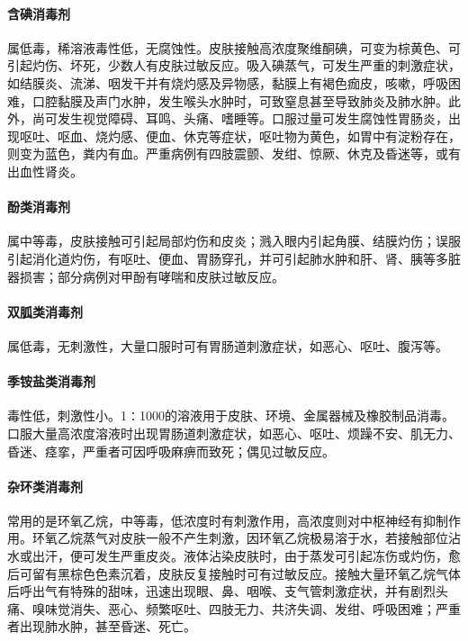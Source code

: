 \paragraph{含碘消毒剂}

属低毒，稀溶液毒性低，无腐蚀性。皮肤接触高浓度聚维酮碘，可变为棕黄色、可引起灼伤、坏死，少数人有皮肤过敏反应。吸入碘蒸气，可发生严重的刺激症状，如结膜炎、流涕、咽发干并有烧灼感及异物感，黏膜上有褐色痂皮，咳嗽，呼吸困难，口腔黏膜及声门水肿，发生喉头水肿时，可致窒息甚至导致肺炎及肺水肿。此外，尚可发生视觉障碍、耳鸣、头痛、嗜睡等。口服过量可发生腐蚀性胃肠炎，出现呕吐、呕血、烧灼感、便血、休克等症状，呕吐物为黄色，如胃中有淀粉存在，则变为蓝色，粪内有血。严重病例有四肢震颤、发绀、惊厥、休克及昏迷等，或有出血性肾炎。

\paragraph{酚类消毒剂}

属中等毒，皮肤接触可引起局部灼伤和皮炎；溅入眼内引起角膜、结膜灼伤；误服引起消化道灼伤，有呕吐、便血、胃肠穿孔，并可引起肺水肿和肝、肾、胰等多脏器损害；部分病例对甲酚有哮喘和皮肤过敏反应。

\paragraph{双胍类消毒剂}

属低毒，无刺激性，大量口服时可有胃肠道刺激症状，如恶心、呕吐、腹泻等。

\paragraph{季铵盐类消毒剂}

毒性低，刺激性小。1∶1000的溶液用于皮肤、环境、金属器械及橡胶制品消毒。口服大量高浓度溶液时出现胃肠道刺激症状，如恶心、呕吐、烦躁不安、肌无力、昏迷、痉挛，严重者可因呼吸麻痹而致死；偶见过敏反应。

\paragraph{杂环类消毒剂}

常用的是环氧乙烷，中等毒，低浓度时有刺激作用，高浓度则对中枢神经有抑制作用。环氧乙烷蒸气对皮肤一般不产生刺激，因环氧乙烷极易溶于水，若接触部位沾水或出汗，便可发生严重皮炎。液体沾染皮肤时，由于蒸发可引起冻伤或灼伤，愈后可留有黑棕色色素沉着，皮肤反复接触时可有过敏反应。接触大量环氧乙烷气体后呼出气有特殊的甜味，迅速出现眼、鼻、咽喉、支气管刺激症状，并有剧烈头痛、嗅味觉消失、恶心、频繁呕吐、四肢无力、共济失调、发绀、呼吸困难；严重者出现肺水肿，甚至昏迷、死亡。

